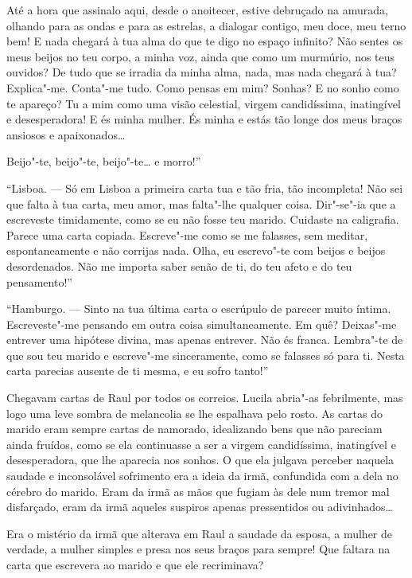 Até a hora que assinalo aqui, desde o anoitecer, estive debruçado na
amurada, olhando para as ondas e para as estrelas, a dialogar contigo,
meu doce, meu terno bem! E nada chegará à tua alma do que te digo no
espaço infinito? Não sentes os meus beijos no teu corpo, a minha voz,
ainda que como um murmúrio, nos teus ouvidos? De tudo que se irradia da
minha alma, nada, mas nada chegará à tua? Explica"-me. Conta"-me tudo.
Como pensas em mim? Sonhas? E no sonho como te apareço? Tu a mim como
uma visão celestial, virgem candidíssima, inatingível e desesperadora! E
és minha mulher. És minha e estás tão longe dos meus braços ansiosos e
apaixonados\ldots{}

Beijo"-te, beijo"-te, beijo"-te\ldots{} e morro!''

\dotfill{}

``Lisboa. --- Só em Lisboa a primeira carta tua e tão fria, tão
incompleta! Não sei que falta à tua carta, meu amor, mas falta"-lhe
qualquer coisa. Dir"-se"-ia que a escreveste timidamente, como se eu não
fosse teu marido. Cuidaste na caligrafia. Parece uma carta copiada.
Escreve"-me como se me falasses, sem meditar, espontaneamente e não
corrijas nada. Olha, eu escrevo"-te com beijos e beijos desordenados. Não
me importa saber senão de ti, do teu afeto e do teu pensamento!''

\dotfill{}

``Hamburgo. --- Sinto na tua última carta o escrúpulo de parecer muito
íntima. Escreveste"-me pensando em outra coisa simultaneamente. Em quê?
Deixas"-me entrever uma hipótese divina, mas apenas entrever. Não és
franca. Lembra"-te de que sou teu marido e escreve"-me sinceramente, como
se falasses só para ti. Nesta carta parecias ausente de ti mesma, e eu
sofro tanto!''

\dotfill{}

Chegavam cartas de Raul por todos os correios. Lucila abria"-as
febrilmente, mas logo uma leve sombra de melancolia se lhe espalhava
pelo rosto. As cartas do marido eram sempre cartas de namorado,
idealizando bens que não pareciam ainda fruídos, como se ela continuasse
a ser a virgem candidíssima, inatingível e desesperadora, que lhe
aparecia nos sonhos. O que ela julgava perceber naquela saudade e
inconsolável sofrimento era a ideia da irmã, confundida com a dela no
cérebro do marido. Eram da irmã as mãos que fugiam às dele num tremor
mal disfarçado, eram da irmã aqueles suspiros apenas pressentidos ou
adivinhados\ldots{}

Era o mistério da irmã que alterava em Raul a saudade da esposa, a
mulher de verdade, a mulher simples e presa nos seus braços para sempre!
Que faltara na carta que escrevera ao marido e que ele recriminava?

